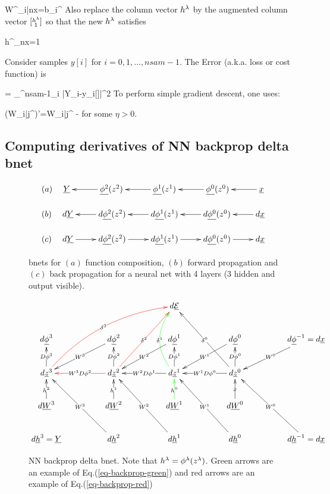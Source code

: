 \beq
W^{\lam}_{i|nx}=b_i^{\lam}
\eeq
Also replace the column vector $h^\lambda$ by the augmented column vector $[{\substack{h^\lambda\\1}}]$ so that the new $h^\lambda$ satisfies

\beq
h^\lam_{nx}=1
\eeq

Consider samples $y[i]$ for
$i=0, 1, \ldots, nsam-1$.
The Error (a.k.a. loss or cost function) is

\beq
\cale =
\sum_{}^{nsam-1}\sum_i
|Y_i-y_i[\sigma]|^2
\eeq
To perform simple gradient descent,
one uses:

\beq
(W_{i|j}^\lam)'=W_{i|j}^\lam
-\eta{}
\label{eq-backp-grad-descent}
\eeq
for some $\eta >0$.


\subsection
{Computing derivatives of NN backprop delta bnet}

\begin{figure}[h!]
\centering
$$
\begin{array}{l}
(a)\quad
\xymatrix@C=2.5pc{
\rvY
&
\ul{\phi^2}
(z^2)\ar[l]
&
\ul{\phi^1}
(z^1)\ar[l]
&
\ul{\phi^0}
(z^0)\ar[l]
&
\rvx\ar[l]
}
\\
\\
(b)\quad
\xymatrix{
d\rvY
&
d\ul{\phi^2}
(z^2)\ar[l]
&
d\ul{\phi^1}
(z^1)\ar[l]
&
d\ul{\phi^0}
(z^0)\ar[l]
&
d\ul{x}\ar[l]
}
\\
\\
(c)\quad
\xymatrix{
d\rvY\ar[r]
&
d\ul{\phi^2}
(z^2)\ar[r]
&
d\ul{\phi^1}
(z^1)\ar[r]
&
d\ul{\phi^0}
(z^0)\ar[r]
&
d\ul{x}
}
\end{array}
$$
\caption{bnets for $(a)$ function
composition, $(b)$
forward propagation and $(c)$ back propagation
for a neural net with 4 layers (3 hidden and
output visible).}
\label{fig-backp-nn}
\end{figure}



\begin{figure}[h!]
$$
\xymatrix@C=4pc{
&
&d\ul{\cale}
&
&
\\
d\ul{\phi}^3
&d\ul{\phi}^2\ar[dl]|{W^3}
&d\ul{\phi}^1\ar[dl]|{W^2}
&d\ul{\phi}^0\ar[dl]|{W^1}
&d\ul{\phi}^{-1}=d\rvx\ar[dl]|{W^0}
\\
d\rvz^3
\ar[u]|{D\phi^{3}}
\ar@[red]@/^1.5pc/[uurr]|{\delta^3}
&d\rvz^2\ar@[red][l]|{W^3D\phi^2}
\ar@[red][uur]|{\delta^2}
\ar[u]|{D\phi^2}
&d\rvz^1\ar[l]|{W^2D\phi^1}
\ar[u]|{D\phi^1}
\ar@[green]@/^1.5pc/[uu]|{\delta^1}
&d\rvz^0\ar[l]|{W^1D\phi^0}
\ar[u]|{D\phi^0}
\ar[uul]|{\delta^0}
&
\\
d\ul{W}^3\ar[u]|{h^{2}}
&d\ul{W}^2\ar[u]|{h^{1}}
&d\ul{W}^1\ar@[green][u]|{h^{0}}
&d\ul{W}^0\ar[u]|{x}
&
\\
d\rvh^3=\rvY
&d\rvh^2\ar[luu]|{W^3}
&d\rvh^1\ar[luu]|{W^2}
&d\rvh^0\ar[luu]|{W^1}
&d\rvh^{-1}=d\rvx
\ar[luu]|{W^0}
}
$$
\caption{NN backprop delta bnet. Note that $h^\lambda=\phi^\lambda(z^\lambda)$.
Green arrows are an example of Eq.(\ref{eq-backprop-green})
and red arrows are an example of Eq.(\ref{eq-backprop-red})}
\label{fig-back-prop-4-layers}
\end{figure}



